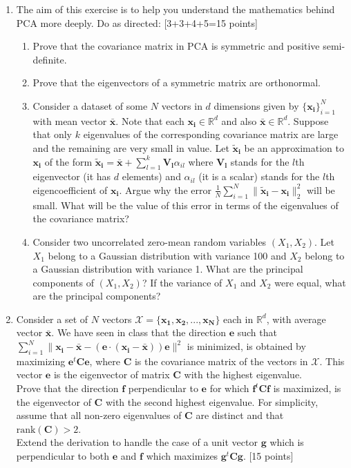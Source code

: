 \documentclass[11pt]{article}
\begin{document}
\begin{enumerate}
\item The aim of this exercise is to help you understand the mathematics behind PCA more deeply. Do as directed: \textsf{[3+3+4+5=15 points]}
\begin{enumerate}
\item Prove that the covariance matrix in PCA is symmetric and positive semi-definite.
\item Prove that the eigenvectors of a symmetric matrix are orthonormal.
\item Consider a dataset of some $N$ vectors in $d$ dimensions given by $\{\boldsymbol{x_i}\}_{i=1}^N$ with mean vector $\boldsymbol{\bar{x}}$. Note that each $\boldsymbol{x_i} \in \mathbb{R}^d$ and also $\boldsymbol{\bar{x}} \in \mathbb{R}^d$.
Suppose that only $k$ eigenvalues of the corresponding covariance matrix are large and the remaining are very small in value. Let $\boldsymbol{\tilde{x}_i}$ be an approximation to $\boldsymbol{x_i}$ of the form $\boldsymbol{\tilde{x}_i} = \boldsymbol{\bar{x}} + \sum_{l=1}^k \boldsymbol{V_l} \alpha_{il}$ where $\boldsymbol{V_l}$ stands for the $l$th eigenvector (it has $d$ elements) and $\alpha_{il}$ (it is a scalar) stands for the $l$th eigencoefficient of $\boldsymbol{x_i}$. Argue why the error $\frac{1}{N} \sum_{i=1}^N \|\boldsymbol{\tilde{x}_i} - \boldsymbol{x_i}\|^2_2$ will be small. What will be the value of this error in terms of the eigenvalues of the covariance matrix?   
\item Consider two uncorrelated zero-mean random variables $(X_1, X_2)$. Let $X_1$ belong to a Gaussian distribution with variance 100 and $X_2$ belong to a Gaussian distribution with variance 1. What are the principal components of $(X_1, X_2)$? If the variance of $X_1$ and $X_2$ were equal, what are the principal components? 
\end{enumerate}

\item Consider a set of $N$ vectors $\mathcal{X} = \{\boldsymbol{x_1}, \boldsymbol{x_2}, ..., \boldsymbol{x_N}\}$ each in $\mathbb{R}^d$, with average vector $\boldsymbol{\bar{x}}$. We have seen in class that the direction $\boldsymbol{e}$ such that $\sum_{i=1}^N \|\boldsymbol{x_i}-\boldsymbol{\bar{x}}-(\boldsymbol{e} \cdot (\boldsymbol{x_i}-\boldsymbol{\bar{x}}))\boldsymbol{e}\|^2$ is minimized, is obtained by maximizing $\boldsymbol{e}^t \boldsymbol{C} \boldsymbol{e}$, where $\boldsymbol{C}$ is the covariance matrix of the vectors in $\mathcal{X}$. This vector $\boldsymbol{e}$ is the eigenvector of matrix $\boldsymbol{C}$ with the highest eigenvalue. 
\\
Prove that the direction $\boldsymbol{f}$ perpendicular to $\boldsymbol{e}$ for which $\boldsymbol{f}^t \boldsymbol{C} \boldsymbol{f}$ is maximized, is the eigenvector of $\boldsymbol{C}$ with the second highest eigenvalue. For simplicity, assume that all non-zero eigenvalues of $\boldsymbol{C}$ are distinct and that $\textrm{rank}(\boldsymbol{C}) > 2$. 
\\
Extend the derivation to handle the case of a unit vector $\boldsymbol{g}$ which is perpendicular to both $\boldsymbol{e}$ and $\boldsymbol{f}$ which maximizes $\boldsymbol{g}^t \boldsymbol{Cg}$. \textsf{[15 points]}



\end{enumerate}
\end{document}
